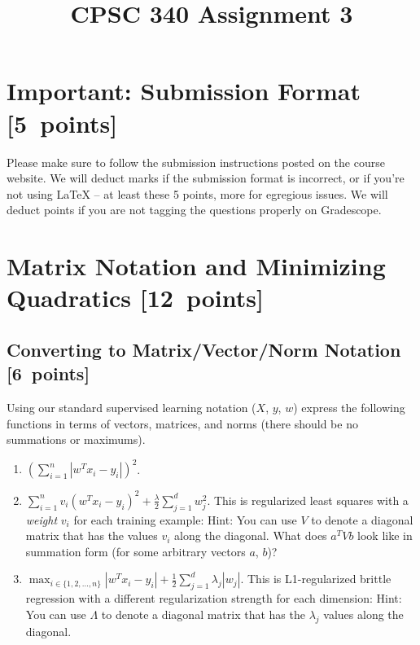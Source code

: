 \documentclass{article}
\newcommand{\blu}[1]{{\textcolor{blu}{#1}}}
\let\ask\blu
\newcommand\pts[1]{\textcolor{pointscolour}{[#1~points]}}
\begin{document}
\title{CPSC 340 Assignment 3}
\date{}
\maketitle


\vspace{-4em}


\section*{Important: Submission Format \pts{5}}

    Please make sure to follow the submission instructions posted on the course website.
    \ask{We will deduct marks if the submission format is incorrect, or if you're not using \LaTeX{}} -- at least these 5 points, more for egregious issues.
    \ask{We will deduct points if you are not tagging the questions properly on Gradescope.}


\section{Matrix Notation and Minimizing Quadratics \pts{12}}

\subsection{Converting to Matrix/Vector/Norm Notation \pts{6}}

Using our standard supervised learning notation ($X$, $y$, $w$)
\ask{express the following functions in terms of vectors, matrices, and norms} (there should be no summations or maximums).
\begin{enumerate}
\item $\left(\sum_{i=1}^n |w^Tx_i - y_i|\right)^2$. 
\item $\sum_{i=1}^n v_i(w^Tx_i  - y_i)^2 + \frac{\lambda}{2}\sum_{j=1}^d w_j^2$. This is regularized least squares with a \emph{weight} $v_i$ for each training example:  Hint: You can use $V$ to denote a diagonal matrix that has the values $v_i$ along the diagonal. What does $a^T V b$ look like in summation form (for some arbitrary vectors $a$, $b$)?
\item $\max_{i \in \{1,2,\dots,n\}}  |w^Tx_i - y_i| +  \frac12 \sum_{j=1}^{d} \lambda_j|w_j|$. This is L1-regularized brittle regression with a different regularization strength for each dimension: Hint: You can use  $\Lambda$ to denote a diagonal matrix that has the $\lambda_j$ values along the diagonal.
\end{enumerate}
\end{document}
